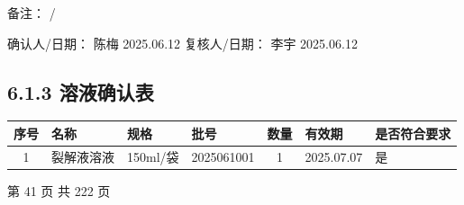 \documentclass[UTF8,10pt,a4paper,fontset=fandol]{ctexart}
\newcommand{\fieldvalue}[1]{#1}
\newcommand{\handwritten}[1]{#1}
\begin{document}
备注：
\handwritten{/}

\noindent
确认人/日期：
\fieldvalue{\handwritten{陈梅}}
\quad
\fieldvalue{\handwritten{2025.06.12}}
\hfill
复核人/日期：
\fieldvalue{\handwritten{李宇}}
\quad
\fieldvalue{\handwritten{2025.06.12}}

\subsection*{6.1.3 溶液确认表}

\begin{tabularx}{\textwidth}{|c|X|X|X|c|X|X|}
\hline
序号 & 名称 & 规格 & 批号 & 数量 & 有效期 & 是否符合要求 \\
\hline
1 &
\fieldvalue{裂解液溶液} &
\fieldvalue{150ml/袋} &
\fieldvalue{\handwritten{2025061001}} &
\fieldvalue{\handwritten{1}} &
\fieldvalue{\handwritten{2025.07.07}} &
\fieldvalue{\handwritten{是}} \\
\hline
\end{tabularx}

\begin{center}
第 41 页 共 222 页
\end{center}
\end{document}

